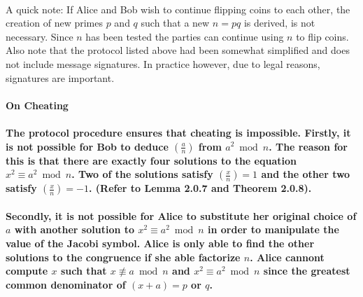 \\
A quick note: If Alice and Bob wish to continue flipping coins to each other, the creation of new primes $p$ and $q$ such that a new $n = pq$ is derived, is not necessary. Since $n$ has been tested the parties can continue using $n$ to flip coins. Also note that the protocol listed above had been somewhat simplified and does not include message signatures. In practice however, due to legal reasons, signatures are important.\\
\\
\bfseries\large On Cheating\\
\\
\normalfont\normalsize The protocol procedure ensures that cheating is impossible. Firstly, it is not possible for Bob to deduce $\left(\frac{a}{n}\right)$ from $a^2 \bmod n$. The reason for this is that there are exactly four solutions to the equation $x^2 \equiv a^2 \bmod n$. Two of the solutions satisfy $\left(\frac{x}{n}\right) = 1$ and the other two satisfy $\left(\frac{x}{n}\right) = -1$. (Refer to Lemma 2.0.7 and Theorem 2.0.8).\\
\\
Secondly, it is not possible for Alice to substitute her original choice of $a$ with another solution to $x^2 \equiv a^2 \bmod n$ in order to manipulate the value of the Jacobi symbol. Alice is only able to find the other solutions to the congruence if she able factorize $n$. Alice cannont compute $x$ such that $x \nequiv a \bmod n$ and $x^2 \equiv a^2 \bmod n$ since the greatest common denominator of $\left(x + a\right)= p$ or $q$.

